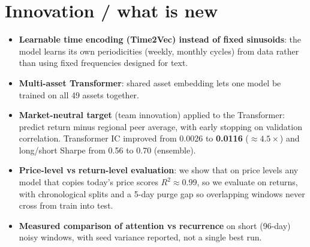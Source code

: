 \documentclass[10pt,a4paper]{article}
\begin{document}
\section{Innovation / what is new}
\begin{itemize}
  \item \textbf{Learnable time encoding (Time2Vec) instead of fixed sinusoids}: the model learns its own periodicities (weekly, monthly cycles) from data rather than using fixed frequencies designed for text.
  \item \textbf{Multi-asset Transformer}: shared asset embedding lets one model be trained on all 49 assets together.
  \item \textbf{Market-neutral target} (team innovation) applied to the Transformer: predict return minus regional peer average, with early stopping on validation correlation. Transformer IC improved from 0.0026 to \textbf{0.0116} ($\approx4.5\times$) and long/short Sharpe from 0.56 to 0.70 (ensemble).
  \item \textbf{Price-level vs return-level evaluation}: we show that on price levels any model that copies today's price scores $R^2\approx0.99$, so we evaluate on returns, with chronological splits and a 5-day purge gap so overlapping windows never cross from train into test.
  \item \textbf{Measured comparison of attention vs recurrence} on short (96-day) noisy windows, with seed variance reported, not a single best run.
\end{itemize}
\end{document}
